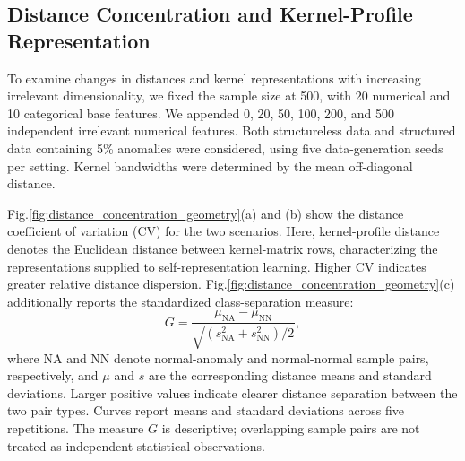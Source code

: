 \documentclass[ASNA,twocolumn]{USG} %
\begin{document}
\subsection{Distance Concentration and Kernel-Profile Representation}

To examine changes in distances and kernel representations with increasing irrelevant dimensionality, we fixed the sample size at 500, with 20 numerical and 10 categorical base features. We appended 0, 20, 50, 100, 200, and 500 independent irrelevant numerical features. Both structureless data and structured data containing 5\% anomalies were considered, using five data-generation seeds per setting. Kernel bandwidths were determined by the mean off-diagonal distance.

Fig.\ref{fig:distance_concentration_geometry}(a) and (b) show the distance coefficient of variation (CV) for the two scenarios. Here, kernel-profile distance denotes the Euclidean distance between kernel-matrix rows, characterizing the representations supplied to self-representation learning. Higher CV indicates greater relative distance dispersion. Fig.\ref{fig:distance_concentration_geometry}(c) additionally reports the standardized class-separation measure:
\begin{equation*}
    G=
\frac{\mu_{\mathrm{NA}}-\mu_{\mathrm{NN}}}
{\sqrt{(s_{\mathrm{NA}}^2+s_{\mathrm{NN}}^2)/2}},
\end{equation*}
where NA and NN denote normal-anomaly and normal-normal sample pairs, respectively, and $\mu$ and $s$ are the corresponding distance means and standard deviations. Larger positive values indicate clearer distance separation between the two pair types. Curves report means and standard deviations across five repetitions. The measure $G$ is descriptive; overlapping sample pairs are not treated as independent statistical observations.
\end{document}
